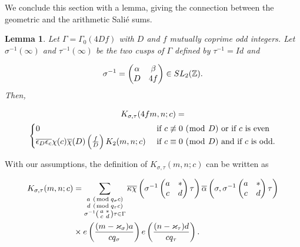 \documentclass[leqno,10pt]{amsart}
\theoremstyle{plain}
\numberwithin{equation}{section}
\newtheorem{lemme}[thm]{Lemma}
\theoremstyle{definition}
\theoremstyle{remark}
\begin{document}
We conclude this section with a lemma, giving the connection between the geometric and the arithmetic Sali\'e sums. 

\begin{lemme}\label{zeta:lemme}
Let $\Gamma=\Gamma_0(4Df)$ with $D$ and $f$ mutually coprime odd integers. Let $\sigma^{-1}(\infty)$ and $\tau^{-1}(\infty)$ be the two cusps of $\Gamma$ defined by $\tau^{-1}=Id$ and

\begin{equation*}
\sigma^{-1} =  \begin{pmatrix} \alpha&\beta\\ D&4 f \end{pmatrix}  \in SL_2(\mathbb{Z}).
\end{equation*}
Then,

\begin{gather*}
K_{\sigma,\tau}(4fm,n;c)=\\
\begin{cases}
0& \textnormal{ if $c\not\equiv 0\ (\bmod\  D)$ or if $c$ is even}\\
\overline{\epsilon_D} \overline{\epsilon_c} \chi(c) \overline{\chi}(D)  \left(\frac{f}{D}\right) K_2(m,n;c) & \textnormal{ if $c\equiv 0\ (\bmod\  D)$ and if $c$ is odd}.
\end{cases}
\end{gather*}
\end{lemme}
 
\proof
With our assumptions, the definition of $K_{\sigma,\tau}(m,n;c)$ can be written as

\begin{equation*}
\begin{split}
K_{\sigma,\tau}(m,n;c) 
&= \sum_{\substack{ a\ (\!\bmod q_\sigma c)\\d \ (\!\bmod q_\tau c)\\ \sigma^{-1} \left(\begin{smallmatrix} a&*\\c&d\end{smallmatrix}\right)\tau \in \Gamma}} 
\overline{\kappa\chi}\left(\sigma^{-1}\begin{pmatrix} a&*\\c&d\end{pmatrix}\tau\right) \overline{\alpha}\left(\sigma,\sigma^{-1}\begin{pmatrix} a&*\\c&d\end{pmatrix}\tau\right) \\ 
&\times e\left(\frac{(m-\varkappa_\sigma)a}{cq_\sigma}\right) e\left(\frac{(n-\varkappa_\tau) d}{cq_\tau}\right).
\end{split}
\end{equation*}
\end{document}
